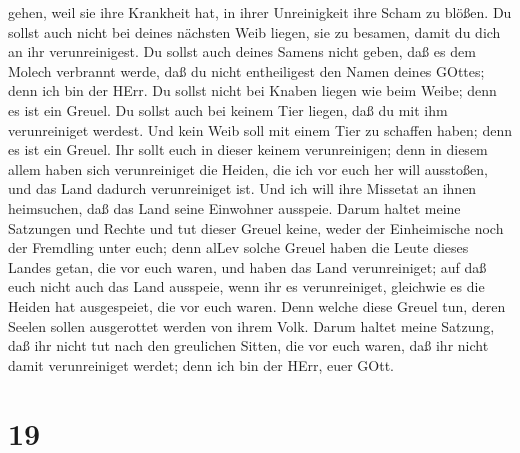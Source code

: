 gehen, weil sie ihre Krankheit hat, in ihrer Unreinigkeit ihre Scham zu
blößen.  Du sollst auch nicht bei deines nächsten Weib
liegen, sie zu besamen, damit du dich an ihr verunreinigest.
 Du sollst auch deines Samens nicht geben, daß es dem
Molech verbrannt werde, daß du nicht entheiligest den Namen deines
GOttes; denn ich bin der HErr.  Du sollst nicht bei Knaben
liegen wie beim Weibe; denn es ist ein Greuel.  Du sollst
auch bei keinem Tier liegen, daß du mit ihm verunreiniget werdest. Und
kein Weib soll mit einem Tier zu schaffen haben; denn es ist ein Greuel.
 Ihr sollt euch in dieser keinem verunreinigen; denn in
diesem allem haben sich verunreiniget die Heiden, die ich vor euch her
will ausstoßen,  und das Land dadurch verunreiniget ist.
Und ich will ihre Missetat an ihnen heimsuchen, daß das Land seine
Einwohner ausspeie.  Darum haltet meine Satzungen und
Rechte und tut dieser Greuel keine, weder der Einheimische noch der
Fremdling unter euch;  denn alLev solche Greuel haben die
Leute dieses Landes getan, die vor euch waren, und haben das Land
verunreiniget;  auf daß euch nicht auch das Land ausspeie,
wenn ihr es verunreiniget, gleichwie es die Heiden hat ausgespeiet, die
vor euch waren.  Denn welche diese Greuel tun, deren Seelen
sollen ausgerottet werden von ihrem Volk.  Darum haltet
meine Satzung, daß ihr nicht tut nach den greulichen Sitten, die vor
euch waren, daß ihr nicht damit verunreiniget werdet; denn ich bin der
HErr, euer GOtt.

\hypertarget{section-18}{%
\section{19}\label{section-18}}

